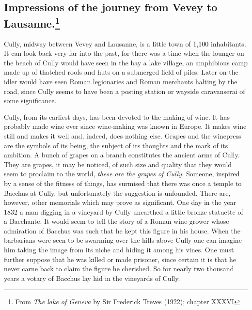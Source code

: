 \documentclass[11pt,a4paper,twocolumn]{article}
\begin{document}
 \barlength{\textwidth}
 \barlength{0pt}

\setlength{\columnseprule}{.4pt}


\vspace*{20mm}
\subsection*{Impressions of the journey from \mbox{Vevey} to Lausanne.\footnote{From
\emph{The lake of Geneva} by Sir Frederick Treves (1922); chapter XXXVI}}

Cully, midway between Vevey and Lausanne, is a little town of 1,100
inhabitants. It can look back very far into the past, for there was a time
when the lounger on the beach of Cully would have seen in the bay a lake
village, an amphibious camp made up of thatched roofs and huts on a submerged
field of piles. Later on the idler would have seen Roman legionaries and
Roman merchants halting by the road, since Cully seems to have been a posting
station or wayside caravanserai of some significance.

Cully, from its earliest days, has been devoted to the making of wine.
It has probably made wine ever since wine-making was known in Europe.
It makes wine still and makes it well and, indeed, does nothing else.
Grapes and the winepress are the symbols of its being, the subject of
its thoughts and the mark of its ambition. A bunch of grapes on a
branch constitutes the ancient arms of Cully. They are grapes, it may
be noticed, of such size and quality that they would seem to proclaim
to the world, \emph{these are the grapes of Cully.}  Someone, inspired
by a sense of the fitness of things, has surmised that there was once a
temple to Bacchus at Cully, but unfortunately the suggestion is
unfounded. There are, however, other memorials which may prove as
significant. One day in the year 1832 a man digging in a vineyard by
Cully unearthed a little bronze statuette of a Bacchante. It would seem
to tell the story of a Roman wine-grower whose admiration of Bacchus
was such that he kept this figure in his house. When the barbarians
were seen to be swarming over the hills above Cully one can imagine him
taking the image from its niche and hiding it among his vines. One must
further suppose that he was killed or made prisoner, since certain it
is that he never carne back to claim the figure he cherished. So for
nearly two thousand years a votary of Bacchus lay hid in the vineyards
of Cully.
\end{document}
